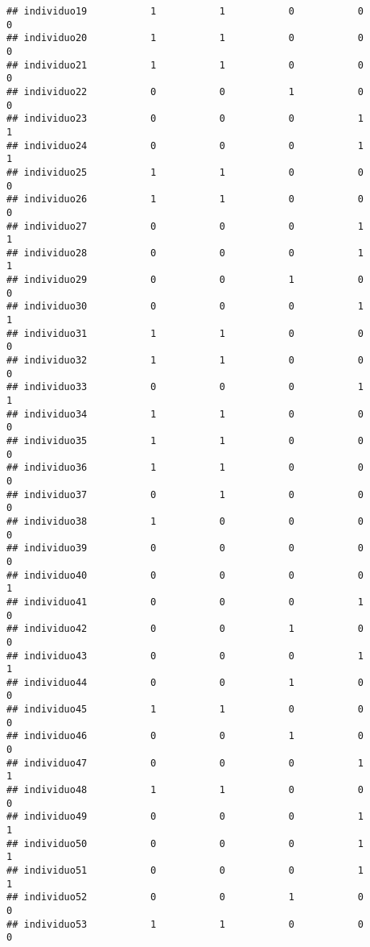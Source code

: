 \documentclass[
]{article}
\begin{document}
\begin{verbatim}
## individuo19           1           1           0           0           0
## individuo20           1           1           0           0           0
## individuo21           1           1           0           0           0
## individuo22           0           0           1           0           0
## individuo23           0           0           0           1           1
## individuo24           0           0           0           1           1
## individuo25           1           1           0           0           0
## individuo26           1           1           0           0           0
## individuo27           0           0           0           1           1
## individuo28           0           0           0           1           1
## individuo29           0           0           1           0           0
## individuo30           0           0           0           1           1
## individuo31           1           1           0           0           0
## individuo32           1           1           0           0           0
## individuo33           0           0           0           1           1
## individuo34           1           1           0           0           0
## individuo35           1           1           0           0           0
## individuo36           1           1           0           0           0
## individuo37           0           1           0           0           0
## individuo38           1           0           0           0           0
## individuo39           0           0           0           0           0
## individuo40           0           0           0           0           1
## individuo41           0           0           0           1           0
## individuo42           0           0           1           0           0
## individuo43           0           0           0           1           1
## individuo44           0           0           1           0           0
## individuo45           1           1           0           0           0
## individuo46           0           0           1           0           0
## individuo47           0           0           0           1           1
## individuo48           1           1           0           0           0
## individuo49           0           0           0           1           1
## individuo50           0           0           0           1           1
## individuo51           0           0           0           1           1
## individuo52           0           0           1           0           0
## individuo53           1           1           0           0           0

\end{verbatim}
\end{document}
